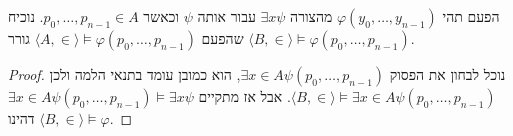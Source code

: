 \Subquestion{}
הפעם תהי $\varphi(y_0, \dots, y_{n - 1})$ מהצורה $\exists x \psi$ עבור אותה $\psi$ וכאשר $p_0, \dots, p_{n - 1} \in A$.
נוכיח שהפעם $\langle A, \in \rangle \models \varphi(p_0, \dots, p_{n - 1})$ גורר $\langle B, \in \rangle \models \varphi(p_0, \dots, p_{n - 1})$.
\begin{proof}
	נוכל לבחון את הפסוק $\exists x \in A \psi(p_0, \dots, p_{n - 1})$, הוא כמובן עומד בתנאי הלמה ולכן $\langle B, \in \rangle \models \exists x \in A \psi(p_0, \dots, p_{n - 1})$.
	אבל אז מתקיים $\exists x \in A \psi(p_0, \dots, p_{n - 1}) \models \exists x \psi$ דהינו $\langle B, \in \rangle \models \varphi$.
\end{proof}


